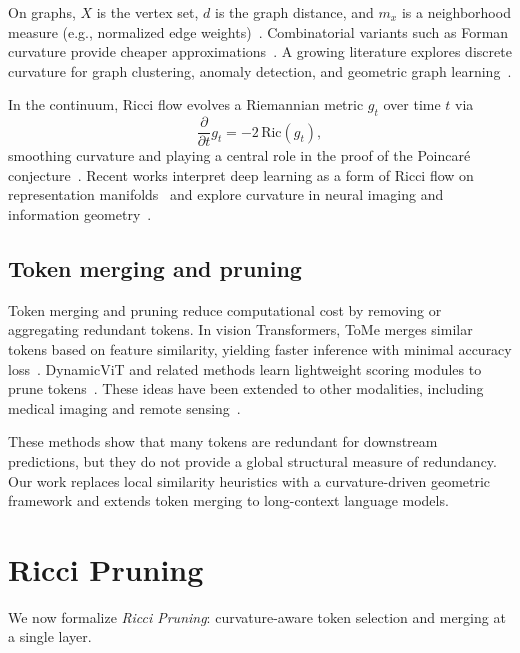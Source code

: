 \documentclass{article}
\theoremstyle{plain}
\theoremstyle{definition}
\theoremstyle{remark}
\begin{document}
On graphs, $X$ is the vertex set, $d$ is the graph distance, and $m_x$ is a neighborhood measure (e.g., normalized edge weights)~\citep{ni2019community}. Combinatorial variants such as Forman curvature provide cheaper approximations~\citep{forman2003bochner,lin2010ricci}. A growing literature explores discrete curvature for graph clustering, anomaly detection, and geometric graph learning~\citep{tian2025curvatureclustering,grover2025curvgad,weber2024discrete,yadav2025roadmap}.

In the continuum, Ricci flow evolves a Riemannian metric $g_t$ over time $t$ via
\begin{equation}
  \frac{\partial}{\partial t} g_t = -2 \,\mathrm{Ric}(g_t),
\end{equation}
smoothing curvature and playing a central role in the proof of the Poincaré conjecture~\citep{morgan2007ricci}. Recent works interpret deep learning as a form of Ricci flow on representation manifolds~\citep{baptista2024deep} and explore curvature in neural imaging and information geometry~\citep{sadeghzadeh2025curvaturereview,akguller2025information}.

\subsection{Token merging and pruning}

Token merging and pruning reduce computational cost by removing or aggregating redundant tokens. In vision Transformers, ToMe merges similar tokens based on feature similarity, yielding faster inference with minimal accuracy loss~\citep{bolya2023tome}. DynamicViT and related methods learn lightweight scoring modules to prune tokens~\citep{rao2021dynamicvit,tang2023dynamicpruning,dong2022heatvit,sah2024bavit}. These ideas have been extended to other modalities, including medical imaging and remote sensing~\citep{morsy2023gaussian,diers2023hippocampal}.

These methods show that many tokens are redundant for downstream predictions, but they do not provide a global structural measure of redundancy. Our work replaces local similarity heuristics with a curvature-driven geometric framework and extends token merging to long-context language models.

\section{Ricci Pruning}
\label{sec:ricci_pruning}

We now formalize \emph{Ricci Pruning}: curvature-aware token selection and merging at a single layer.
\end{document}
